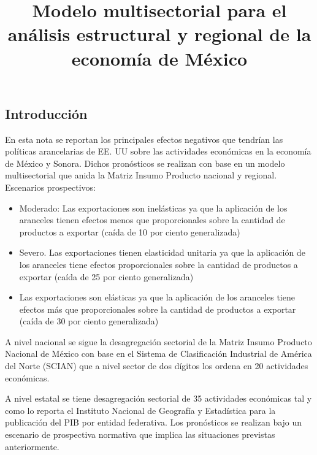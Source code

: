 

\author{}

\title{Modelo multisectorial para el análisis estructural y regional de la economía de México}



\maketitle

\subsection*{Introducción}

En esta nota se reportan los principales efectos negativos que tendrían las políticas arancelarias de EE. UU sobre las actividades económicas en la economía de México y Sonora. Dichos pronósticos se realizan con base en un modelo multisectorial que anida la Matriz Insumo Producto nacional y regional.
Escenarios prospectivos:
\begin{itemize}
    \item Moderado: Las exportaciones son inelásticas ya que la aplicación de los aranceles tienen efectos menos que proporcionales sobre la cantidad de productos a exportar (caída de 10 por ciento generalizada)
    \item Severo. Las exportaciones tienen elasticidad unitaria ya que la aplicación de los aranceles tiene efectos proporcionales sobre la cantidad de productos a exportar (caída de 25 por ciento generalizada)
    \item Las exportaciones son elásticas ya que la aplicación de los aranceles tiene efectos más que proporcionales sobre la cantidad de productos a exportar (caída de 30 por ciento generalizada)
\end{itemize}

A nivel nacional se sigue la desagregación sectorial de la Matriz Insumo Producto Nacional de México con base en el Sistema de Clasificación Industrial de América del Norte (SCIAN) que a nivel sector de dos dígitos los ordena en 20 actividades económicas. 

A nivel estatal se tiene desagregación sectorial de 35 actividades económicas tal y como lo reporta el Instituto Nacional de Geografía y Estadística para la publicación del PIB por entidad federativa. Los pronósticos se realizan bajo un escenario de prospectiva normativa que implica las situaciones previstas anteriormente.

